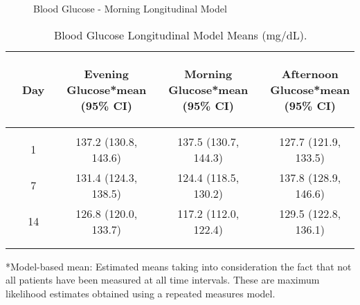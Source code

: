 \documentclass[dvips, 10pt]{article}
\begin{document}
\begin{figure}
\caption{Blood Glucose - Morning Longitudinal Model}
\end{figure}
\clearpage
\begin{table}[t]
\caption
{ Blood Glucose Longitudinal Model Means (mg/dL). }
\begin{center}
\begin{tabular}{ @{}l@{}
@{}c@{}@{}p{1.5em}@{}@{}c@{}@{}p{1.5em}@{}@{}c@{}@{}p{1.5em}@{}@{}c@{}
}
\hline

& \parbox{6em}{\begin{center}Day\end{center}} && \parbox{6em}{\begin{center}Evening Glucose*mean (95\% CI)\end{center}} && \parbox{6em}{\begin{center}Morning Glucose*mean (95\% CI)\end{center}} && \parbox{6em}{\begin{center}Afternoon Glucose*mean (95\% CI)\end{center}} \\

\hline

\\
& 1 && 137.2 (130.8, 143.6) && 137.5 (130.7, 144.3) && 127.7 (121.9, 133.5) \\
& 7 && 131.4 (124.3, 138.5) && 124.4 (118.5, 130.2) && 137.8 (128.9, 146.6) \\
& 14 && 126.8 (120.0, 133.7) && 117.2 (112.0, 122.4) && 129.5 (122.8, 136.1) \\
\\
\hline \\

\end{tabular}


\parbox{ 5in }{ *Model-based mean:  Estimated means taking into consideration the fact that
       not all patients have been measured at all time intervals.  These are maximum likelihood
       estimates obtained using a repeated measures model. } \\
 \vspace{1em}\end{center}
 \end{table}
\end{document}

